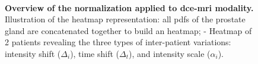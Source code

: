 \documentclass[final,3p,times,twocolumn]{elsarticle}
\begin{document}
\begin{figure}
  \centering
  \hspace*{\fill}
   \hfill
  \hspace*{\fill}
  \\
  \hspace*{\fill}
   \hfill
   \hfill
  \hspace*{\fill}
  \caption{\textbf{Overview of the normalization applied to \ac{dce}-\ac{mri}
      modality.} \protect{} Illustration of the heatmap
    representation: all \ac*{pdf}s of the prostate gland are concatenated together
    to build an heatmap; \protect{}-\protect{}
    Heatmap of 2 patients revealing the three types of inter-patient variations:
    intensity shift ($\Delta_i$), time shift ($\Delta_t$), and intensity scale
    ($\alpha_i$).}
  \label{fig:heatmap}
\end{figure}
\end{document}
